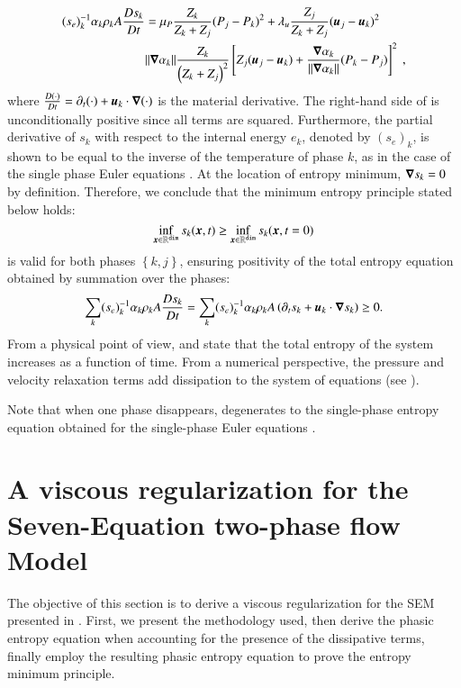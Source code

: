 \documentclass[preprint,10pt]{elsarticle}
\begin{document}
%
\begin{align} \label{eq:ent-eqn-7-eqn-model}
(s_{e})_k^{-1} \alpha_k \rho_k A \frac{Ds_k}{Dt} &= \mu_P \frac{Z_k}{Z_k+Z_j} (P_j - P_k)^2 + \lambda_u \frac{Z_j}{Z_k+Z_j} (\boldsymbol u_j -\boldsymbol u_k)^2 \nonumber
\\
& \| \boldsymbol\nabla \alpha_k \| \frac{Z_k}{\left( Z_k+Z_j \right)^2} \left[ Z_j (\boldsymbol u_j-\boldsymbol u_k)+\frac{\boldsymbol\nabla \alpha_k}{\| \boldsymbol\nabla \alpha_k \|}(P_k-P_j)\right]^2 \ ,
\end{align}
%
where $\frac{D(\cdot) }{Dt} = \partial_t (\cdot) + \boldsymbol u_k \cdot \boldsymbol\nabla (\cdot)$ is the material derivative.
The right-hand side of  is unconditionally positive since all terms are squared. Furthermore, 
the partial derivative of $s_k$ with respect to the internal energy $e_k$, denoted by $(s_e)_k$, is shown to be equal to the inverse of the temperature of phase $k$, as in the case of the single phase Euler equations \cite{jlg, Marco_dissertation}. At the location of entropy minimum, $\boldsymbol\nabla s_k =0$ by definition. Therefore, we conclude  that the minimum entropy principle stated below holds:
%
\begin{equation} \label{eq:entro-min-def}
\inf_{\boldsymbol x \in \mathbb{R}^{\texttt{dim}}} s_k(\boldsymbol x ,t) \ge \inf_{\boldsymbol x \in \mathbb{R}^{\texttt{dim}}} s_k(\boldsymbol x ,t=0) 
\end{equation}
%
 is valid for both phases $\left\{k, j\right\}$, ensuring positivity of the total entropy equation obtained by summation over the phases:
%
\begin{equation}\label{eq:tot-ent-res-sct4}
\sum_k (s_{e})_k^{-1} \alpha_k \rho_k A \frac{Ds_k}{Dt} = \sum_k (s_{e})_k^{-1} \alpha_k \rho_k A \left( \partial_t s_k + \boldsymbol u_k \cdot \boldsymbol\nabla s_k \right) \geq 0  .
\end{equation}
%
From a physical point of view,  and  state that the total entropy of the system increases as a function of time. From a numerical perspective, the pressure and velocity relaxation terms add dissipation to the system of equations (see ).

Note that when one phase disappears,  degenerates to the single-phase entropy equation obtained for the single-phase Euler equations \cite{SEM, Marco_dissertation}.

\section{A viscous regularization for the Seven-Equation two-phase flow Model}\label{sec:visc-regu}
%
The objective of this section is to derive a viscous regularization for the SEM presented in . First, we present the methodology used, then derive the phasic entropy equation when accounting for the presence of the dissipative terms, finally employ the resulting phasic entropy equation to prove the entropy minimum principle.
%
\end{document}
